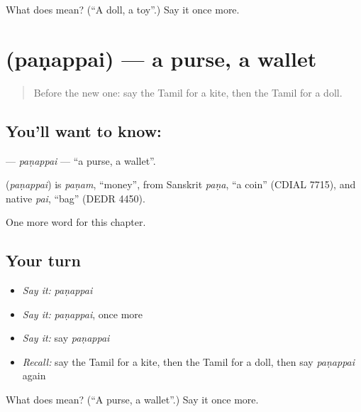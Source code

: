 \begin{tcolorbox}[breakable,colback=teal!4,colframe=teal!35!black,title={Before you move on}]
What does  mean? (\textquotedblleft{}A doll, a toy\textquotedblright{}.) Say it once more.
\end{tcolorbox}
\section[\texorpdfstring{\ta{பணப்பை} (paṇappai)}{பணப்பை (paṇappai)}]{ (paṇappai) — a purse, a wallet}

\label{lesson:TA-C136-panappai}



\begin{quote}
Before the new one: say the Tamil for a kite, then the Tamil for a doll.
\end{quote}

\subsection*{You'll want to know: }
\textbf{} — \emph{paṇappai} — \textquotedblleft{}a purse, a wallet\textquotedblright{}.

\begin{cousinweb}
\textbf{} (\emph{paṇappai}) is \emph{paṇam}, \textquotedblleft{}money\textquotedblright{}, from Sanskrit \emph{paṇa}, \textquotedblleft{}a coin\textquotedblright{} (CDIAL 7715), and native \emph{pai}, \textquotedblleft{}bag\textquotedblright{} (DEDR 4450).
\end{cousinweb}

\begin{grammarlens}[title={What you've built}]
One more word for this chapter.
\end{grammarlens}

\subsection*{Your turn}
\begin{itemize}
\raggedright
  \item \emph{Say it:} \emph{paṇappai}
  \item \emph{Say it:} \emph{paṇappai}, once more
  \item \emph{Say it:} say \emph{paṇappai}
  \item \emph{Recall:} say the Tamil for a kite, then the Tamil for a doll, then say \emph{paṇappai} again
\end{itemize}

\begin{tcolorbox}[breakable,colback=teal!4,colframe=teal!35!black,title={Before you move on}]
What does  mean? (\textquotedblleft{}A purse, a wallet\textquotedblright{}.) Say it once more.
\end{tcolorbox}
